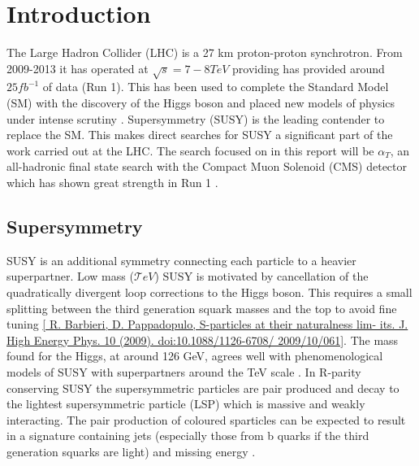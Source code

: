 
\chapter{Introduction} %

\label{Chapter1} %


The Large Hadron Collider (LHC) is a 27 km proton-proton synchrotron. 
From 2009-2013 it has operated at $\sqrt{s}=7-8TeV$ providing has provided around $25fb^{-1}$ of data (Run 1). 
This has been used to complete the Standard Model (SM) with the discovery of the Higgs boson 
and placed new models of physics under intense scrutiny \cite{cmshiggs}\cite{atlashiggs}\cite{susyr1}. 
Supersymmetry (SUSY) is the leading contender to replace the SM. 
This makes direct searches for SUSY a significant part of the work carried out at the LHC. 
The search focused on in this report will be $\alpha_T$, 
an all-hadronic final state search with the Compact Muon Solenoid (CMS) detector 
which has shown great strength in Run 1 \cite{search}. 

\section {Supersymmetry}
SUSY is an additional symmetry connecting each particle to a heavier superpartner. 
Low mass ($\mathcal TeV$) SUSY is motivated by cancellation of the quadratically divergent loop corrections to the Higgs boson. 
This requires a small splitting between the third generation squark masses and the top to avoid fine tuning 
\ref{ R. Barbieri, D. Pappadopulo, S-particles at their naturalness lim- its. J. High Energy Phys. 10 (2009). doi:10.1088/1126-6708/ 2009/10/061}. 
The mass found for the Higgs, at around 126 GeV, agrees well with phenomenological models of SUSY 
with superpartners around the TeV scale \cite{susyhiggs}. 
In R-parity conserving SUSY \cite{susywimp} the supersymmetric particles are pair produced and 
decay to the lightest supersymmetric particle (LSP) which is massive and weakly interacting. 
The pair production of coloured sparticles can be expected to result in a signature containing jets
(especially those from b quarks if the third generation squarks are light) and missing energy \met.

